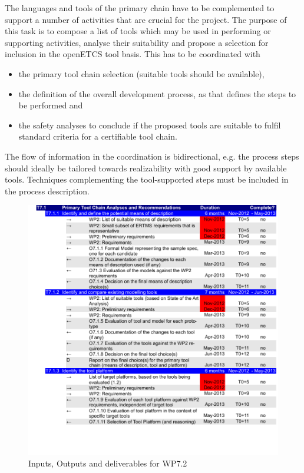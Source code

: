 \documentclass{template/openetcs_article}
\begin{document}
The languages and tools  of the primary chain have to be complemented to support a number of activities that are crucial for the project. The purpose of this task is to compose a list of tools which may be
used in performing or supporting  activities, analyse their
suitability and propose a selection for inclusion in the openETCS tool
basis. This has to be coordinated with 

\begin{itemize}
\item the primary tool chain selection (suitable  tools should be
  available), 
\item the definition of the overall development process, as that defines the steps to be performed and 
\item the safety analyses to  conclude if the proposed tools are suitable to fulfil standard criteria for a certifiable tool chain.
\end{itemize}

The flow of information in the coordination is bidirectional, e.g. the process
steps should ideally be tailored towards realizability with good
support by available tools. Techniques complementing the
tool-supported steps must be included in the process description. 
  
\begin{figure}[!ht]
	\begin{center}
	\includegraphics[width=\textwidth,page=2]{project_plan/WP7_Project_Management.pdf}
	\caption{Inputs, Outputs and deliverables for WP7.2}
	\label{fig:wrspm}
	\end{center}
\end{figure}
\end{document}
